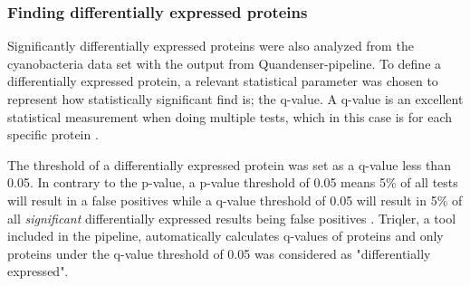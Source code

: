 \subsubsection{Finding differentially expressed proteins}
Significantly differentially expressed proteins were also analyzed from the cyanobacteria data set with the output from Quandenser-pipeline. To define a differentially expressed protein, a relevant statistical parameter was chosen to represent how statistically significant find is; the q-value. A q-value is an excellent statistical measurement when doing multiple tests, which in this case is for each specific protein \cite{q-value}.

The threshold of a differentially expressed protein was set as a q-value less than 0.05. In contrary to the p-value, a p-value threshold of 0.05 means 5\% of all tests will result in a false positives while a q-value threshold of 0.05 will result in 5\% of all \textit{significant} differentially expressed results being false positives \cite{q-value} \cite{nonlinear}. Triqler, a tool included in the pipeline, automatically calculates q-values of proteins and only proteins under the q-value threshold of 0.05 was considered as "differentially expressed".
